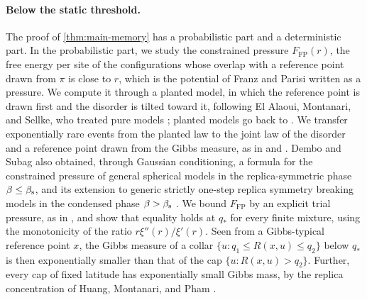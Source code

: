 \paragraph{Below the static threshold.}
The proof of \cref{thm:main-memory} has a probabilistic part and a deterministic part. In the probabilistic part, we study the constrained pressure $F_{\mathrm{FP}}(r)$, the free energy per site of the configurations whose overlap with a reference point drawn from $\pi$ is close to $r$, which is the potential of Franz and Parisi \cite{FranzParisi1995} written as a pressure. We compute it through a planted model, in which the reference point is drawn first and the disorder is tilted toward it, following El Alaoui, Montanari, and Sellke, who treated pure models \cite[Propositions~3.7 and~3.8]{ElAlaouiMontanariSellke2025}; planted models go back to \cite{AchlioptasCojaOghlan2008,KrzakalaZdeborova2009}. We transfer exponentially rare events from the planted law to the joint law of the disorder and a reference point drawn from the Gibbs measure, as in \cite[Lemma~3.5]{ElAlaouiMontanariSellke2025} and \cite[Lemma~2.3]{AuffingerElAlaouiSellke2025}. Dembo and Subag also obtained, through Gaussian conditioning, a formula for the constrained pressure of general spherical models in the replica-symmetric phase $\beta\le\beta_{\mathrm s}$, and its extension to generic strictly one-step replica symmetry breaking models in the condensed phase $\beta>\beta_{\mathrm s}$ \cite[Corollary~2.1 and Theorem~2.3]{DemboSubag2026}.
We bound $F_{\mathrm{FP}}$ by an explicit trial pressure, as in \cite[Proposition~3.9]{ElAlaouiMontanariSellke2025}, and show that equality holds at $q_*$ for every finite mixture, using the monotonicity of the ratio $r\xi''(r)/\xi'(r)$. Seen from a Gibbs-typical reference point $x$, the Gibbs measure of a collar $\{u:q_1\le R(x,u)\le q_2\}$ below $q_*$ is then exponentially smaller than that of the cap $\{u:R(x,u)>q_2\}$. Further, every cap of fixed latitude has exponentially small Gibbs mass, by the replica concentration of Huang, Montanari, and Pham \cite[Lemma~7.7]{HuangMontanariPham2024}.

